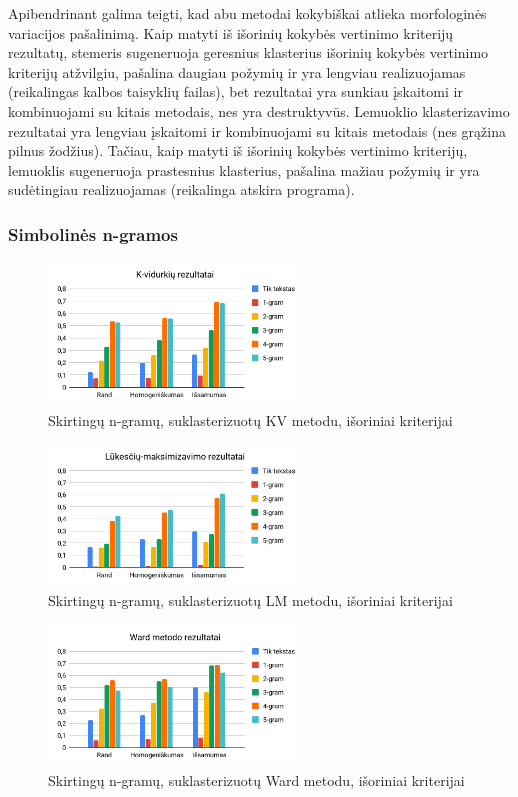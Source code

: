 \documentclass{VUMIFInfBakalaurinis}
\begin{document}
Apibendrinant galima teigti, kad abu metodai kokybiškai atlieka
morfologinės variacijos pašalinimą. Kaip matyti iš išorinių kokybės vertinimo kriterijų
rezultatų, stemeris sugeneruoja geresnius klasterius išorinių kokybės vertinimo kriterijų
atžvilgiu, pašalina daugiau požymių ir yra lengviau realizuojamas
(reikalingas kalbos taisyklių failas), bet rezultatai yra sunkiau
įskaitomi ir kombinuojami su kitais metodais, nes yra destruktyvūs.
Lemuoklio klasterizavimo rezultatai yra lengviau įskaitomi ir
kombinuojami su kitais metodais (nes grąžina pilnus žodžius). Tačiau,
kaip matyti iš išorinių kokybės vertinimo kriterijų, lemuoklis sugeneruoja prastesnius
klasterius, pašalina mažiau požymių ir yra sudėtingiau realizuojamas
(reikalinga atskira programa).

\subsubsection{Simbolinės n-gramos}

\begin{figure}[H]
	\centering
	\includegraphics[width=0.6\textwidth]{./img/image8.png}
  \caption{Skirtingų n-gramų, suklasterizuotų KV metodu, išoriniai
  kriterijai}
\end{figure}

\begin{figure}[H]
	\centering
	\includegraphics[width=0.6\textwidth]{./img/image24.png}
  \caption{Skirtingų n-gramų, suklasterizuotų LM metodu, išoriniai
  kriterijai}
\end{figure}

\begin{figure}[H]
	\centering
	\includegraphics[width=0.6\textwidth]{./img/image20.png}
  \caption{Skirtingų n-gramų, suklasterizuotų Ward metodu, išoriniai
  kriterijai}
\end{figure}
\end{document}
